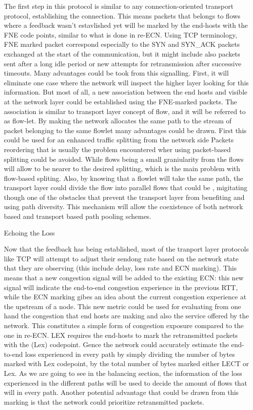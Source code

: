The first step in this protocol is similar to any connection-oriented transport protocol, establishing the connection. This means packets that belongs to flows where a feedback wasn't estavlished yet will be marked by the end-hosts with the FNE code points, similar to what is done in re-ECN. Using TCP terminology, FNE marked packet correspond especially to the SYN and SYN_ACK packets exchanged at the start of the communication, but it might include also packets sent after a long idle period or new attempts for retransmission after successive timeouts. 
Many advantages could be took from this signalling. First, it will eliminate one case where the network will inspect the higher layer looking for this information. But most of all, a new association between the end hosts and visible at the network layer could be established using the FNE-marked packets. The association is similar to transport layer concept of flow, and it will be referred to as flow-let. By making the network allocates the same path to the stream of packet belonging to the same flowlet many advantages could be drawn. First this could be used for an enhanced traffic splitting from the network side Packets reordering that is usually the problem encountered wher using packet-based splitting could be avoided. While flows being a small graniularity from the flows will allow to be nearer to the desired splitting, which is the main problem with flow-based spliting. Also, by knowing that a flowlet will take the same path, the transport layer could divide the flow into parallel flows that could be , migitating though one of the obstacles that prevent the transport layer from benefiting and using path diversity. This mechanism will allow the coexistence of both network based and transport based path pooling schemes.

Echoing the Loss

Now that the feedback has being established, most of the tranport layer protocols like TCP will attempt to adjust their sendong rate based on the network state that they are observing (this include delay, loss rate and ECN marking). This means that a new congestion signal will be added to the existing ECN: this new signal will indicate the end-to-end congestion experience in the previous RTT, while the ECN marking gibes an idea about the current congestion experience at the upstream of a node. This new metric could be used for evaluating from one hand the congestion that end hosts are making and also the service offered by the network. This constitutes a simple form of congestion exposure compared to the one in re-ECN. LEX requires the end-hosts to mark the retransmitted packets with the (Lex) codepoint. Gence the network could accurately estimate the end-to-end loss experienced in every path by simply dividing the number of bytes marked with Lex codepoint,  by the total number of bytes marked either LECT or Lex. As we are going to see in the balancing section, the information of the loss experienced in the different paths will be used to decide the amount of flows that will in every path. Another potential advantage that could be drawn from this marking is that the network could prioritize retransmitted packets.

